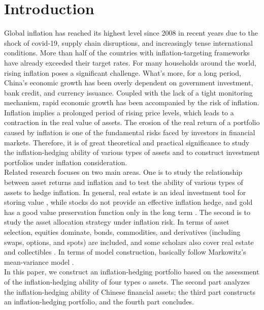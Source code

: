 \documentclass[12pt]{article}
\begin{document}
\section{Introduction}
Global inflation has reached its highest level since 2008 in recent years due to the shock of covid-19, supply chain disruptions, and increasingly tense international conditions. More than half of the countries with inflation-targeting frameworks have already exceeded their target rates. For many households around the world, rising inflation poses a significant challenge. What's more, for a long period, China's economic growth has been overly dependent on government investment, bank credit, and currency issuance. Coupled with the lack of a tight monitoring mechanism, rapid economic growth has been accompanied by the risk of inflation.\\
Inflation implies a prolonged period of rising price levels, which leads to a contraction in the real value of assets. The erosion of the real return of a portfolio caused by inflation is one of the fundamental risks faced by investors in financial markets. Therefore, it is of great theoretical and practical significance to study the inflation-hedging ability of various types of assets and to construct investment portfolios under inflation consideration.\\
Related research focuses on two main areas. One is to study the relationship between asset returns and inflation and to test the ability of various types of assets to hedge inflation. In general, real estate is an ideal investment tool for storing value \citep{FAMA1977115,di2012can}, while stocks do not provide an effective inflation hedge\citep{rapach2002long,engsted2002relation}, and gold has a good value preservation function only in the long term \citep{levin2006short}. The second is to study the asset allocation strategy under inflation risk. In terms of asset selection, equities dominate, bonds, commodities, and derivatives (including swaps, options, and spots) are included, and some scholars also cover real estate and collectibles \citep{attie2009inflation}. In terms of model construction, basically follow Markowitz's mean-variance model \citep{qin2004optimal, yu2015study}.\\
In this paper, we construct an inflation-hedging portfolio based on the assessment of the inflation-hedging ability of four types o assets. The second part analyzes the inflation-hedging ability of Chinese financial assets; the third part constructs an inflation-hedging portfolio, and the fourth part concludes.\\
\end{document}
